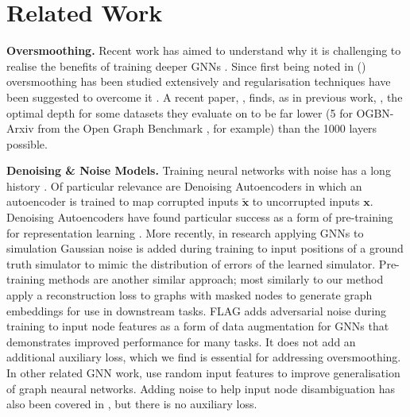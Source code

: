 \documentclass{article} \usepackage{iclr2022_conference,times}
\begin{document}
\section{Related Work}



\textbf{Oversmoothing.} Recent work has aimed to understand why it is challenging to realise the benefits of training deeper GNNs \citep{wu2020comprehensive}. Since first being noted in (\citep{li2018deeper}) oversmoothing has been studied extensively and regularisation techniques have been suggested to overcome it \citep{Chen2019Oversmoothing, Cai2020Oversmoothing, RongDropEdge2019, ZhouNodeNorm2020, yang2020revisiting, Do2021GraphCN, Zhao2020PairNormTO}. A recent paper, \citep{Li1000Layers2021}, finds, as in previous work, \citep{Li2019DeepGCNsCG, Li2020DeeperGCNAY}, the optimal depth for some datasets they evaluate on to be far lower (5 for OGBN-Arxiv from the Open Graph Benchmark \citep{Hu2020OpenGB}, for example) than the 1000 layers possible.

\textbf{Denoising \& Noise Models.} Training neural networks with noise has a long history \citep{Sietsma1991CreatingAN, Bishop1995TrainingWN}. Of particular relevance are Denoising Autoencoders \citep{Vincent2008ExtractingAC} in which an autoencoder is trained to map corrupted inputs $\tilde{\textbf{x}}$ to uncorrupted inputs $\textbf{x}$. Denoising Autoencoders have found particular success as a form of pre-training for representation learning \citep{Vincent2010StackedDA}. More recently, in research applying GNNs to simulation  \citep{SanchezGonzalez2018GraphNA, pmlr-v119-sanchez-gonzalez20a, Pfaff2020LearningMS} Gaussian noise is added during training to input positions of a ground truth simulator to mimic the distribution of errors of the learned simulator. Pre-training methods \citep{Devlin2019BERTPO, You2020GraphCL, Thakoor2021BootstrappedRL} are another similar approach; most similarly to our method \cite{Hu2020StrategiesFP} apply a reconstruction loss to graphs with masked nodes to generate graph embeddings for use in downstream tasks. FLAG \citep{Kong2020FLAGAD} adds adversarial noise during training to input node features as a form of data augmentation for GNNs that demonstrates improved performance for many tasks. It does not add an additional auxiliary loss, which we find is essential for addressing oversmoothing. In other related GNN work, \citep{Sato2021RandomFS} use random input features to improve generalisation of graph neaural networks. Adding noise to help input node disambiguation has also been covered in \citep{Dasoulas2019ColoringGN, Loukas2020HowHI, Vignac2020BuildingPA, Murphy2019RelationalPF}, but there is no auxiliary loss. 
\end{document}
